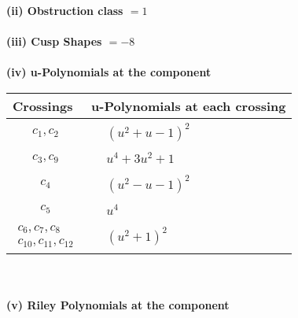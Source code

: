\documentclass[1p]{elsarticle_modified}
\theoremstyle{definition}
\begin{document}
\flushleft \textbf{(ii) Obstruction class $= 1$}\\~\\
\flushleft \textbf{(iii) Cusp Shapes $= -8$}\\~\\
\newpage\renewcommand{\arraystretch}{1}
\flushleft \textbf{(iv) u-Polynomials at the component}\newline \\
\begin{tabular}{m{50pt}|m{274pt}}
Crossings & \hspace{64pt}u-Polynomials at each crossing \\
\hline $$\begin{aligned}c_{1},c_{2}\end{aligned}$$&$\begin{aligned}
&(u^2+u-1)^2
\end{aligned}$\\
\hline $$\begin{aligned}c_{3},c_{9}\end{aligned}$$&$\begin{aligned}
&u^4+3 u^2+1
\end{aligned}$\\
\hline $$\begin{aligned}c_{4}\end{aligned}$$&$\begin{aligned}
&(u^2- u-1)^2
\end{aligned}$\\
\hline $$\begin{aligned}c_{5}\end{aligned}$$&$\begin{aligned}
&u^4
\end{aligned}$\\
\hline $$\begin{aligned}c_{6},c_{7},c_{8}\\c_{10},c_{11},c_{12}\end{aligned}$$&$\begin{aligned}
&(u^2+1)^2
\end{aligned}$\\
\hline
\end{tabular}\\~\\
\newpage\renewcommand{\arraystretch}{1}
\flushleft \textbf{(v) Riley Polynomials at the component}\newline \\
\end{document}
